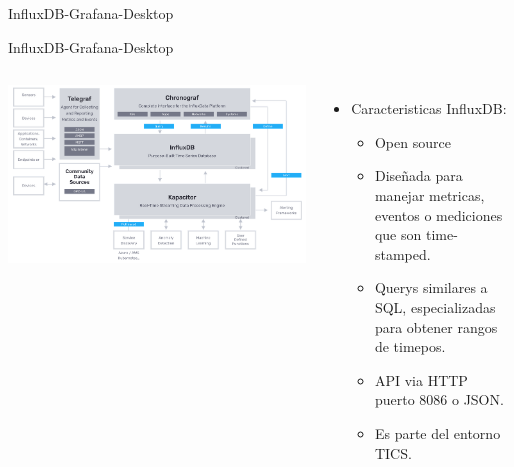\documentclass[aspectratio= 43]{beamer}
\begin{document}
\begin{frame}{InfluxDB-Grafana-Desktop}
\end{frame}


\begin{frame}{InfluxDB-Grafana-Desktop}
   \begin{columns}
      \includegraphics [scale = 0.2 ]{./Images/TICS.png}
      \begin{itemize}
       \item{Caracteristicas InfluxDB:}
        \begin{itemize}
               \item {Open source}
               \item {Diseñada para manejar metricas, eventos o mediciones que son time-stamped.}
               \item {Querys similares a SQL, especializadas para obtener rangos de timepos.}
               \item {API via HTTP puerto 8086 o JSON.}
               \item {Es parte del entorno TICS.}
        \end{itemize}
    \end{itemize}
   \end{columns}
  \end{frame}
\end{document}
